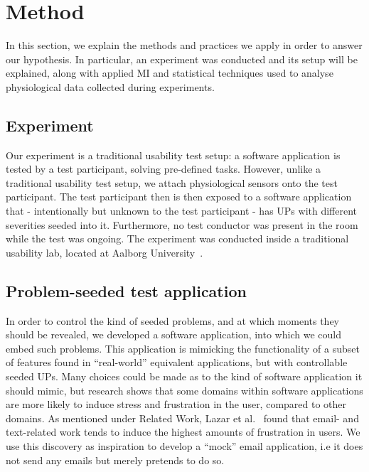 \section{Method}\label{sec:method}
In this section, we explain the methods and practices we apply in order to answer our hypothesis. In particular, an
experiment was conducted and its setup will be explained, along with applied MI and statistical techniques used to
analyse physiological data collected during experiments.

\subsection{Experiment}
Our experiment is a traditional usability test setup: a software application is tested by a test participant, solving pre-defined tasks. 
However, unlike a traditional usability test setup, we attach physiological sensors onto the test participant.
The test participant then is then exposed to a software application that - intentionally but unknown to the test participant - has UPs with different severities seeded into it. 
Furthermore, no test conductor was present in the room while the test was ongoing.
The experiment was conducted inside a traditional usability lab, located at Aalborg University~\cite{usability_lab_cassiopeia}.


\subsection{Problem-seeded test application}
In order to control the kind of seeded problems, and at which moments they should be revealed, we developed a software
application, into which we could embed such problems. This application is mimicking the functionality of a subset of
features found in ``real-world'' equivalent applications, but with controllable seeded UPs.  Many choices could be
made as to the kind of software application it should mimic, but research shows that some domains within software
applications are more likely to induce stress and frustration in the user, compared to other domains.  As mentioned
under Related Work, Lazar et al.~\cite{frustration_with_computers} found that email- and text-related work tends to
induce the highest amounts of frustration in users. We use this discovery as inspiration to develop a ``mock'' email
application, i.e it does not send any emails but merely pretends to do so.

